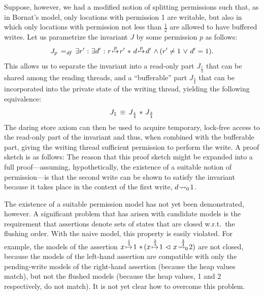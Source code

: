 \documentclass[11pt]{report}
\begin{document}
Suppose, however, we had a modified notion of splitting permissions such that, as in Bornat's model, only locations with permission 1 are writable, but also in which only locations with permission not less than $\frac{1}{2}$ are allowed to have buffered writes. Let us parametrize the invariant $J$ by some permission $p$ as follows: \[ J_p \operatorname{\;=_{\mathit{df}}\;} \exists r' \operatorname{\,:\,} \exists d' \operatorname{\,:\,} r \stackrel{p}{\!\mapsto\!} r' \operatorname{\,\ast\,} d \stackrel{p}{\!\mapsto\!} d' \operatorname{\,\wedge\,} (r' \neq 1 \operatorname{\,\vee\,} d' = 1). \] This allows us to separate the invariant into a read-only part $J_{\frac{1}{4}}$ that can be shared among the reading threads, and a ``bufferable'' part $J_{\frac{3}{4}}$ that can be incorporated into the private state of the writing thread, yielding the following equivalence: \[ J_1 \,\equiv\, J_{\frac{1}{4}} \operatorname{\,\ast\,} J_{\frac{3}{4}}\] The daring store axiom can then be used to acquire temporary, lock-free access to the read-only part of the invariant and thus, when combined with the bufferable part, giving the writing thread sufficient permission to perform the write. A proof sketch is as follows: 
 The reason that this proof sketch might be expanded into a full proof---assuming, hypothetically, the existence of a suitable notion of permission---is that the second write can be shown to satisfy the invariant because it takes place in the context of the first write, $d \!\leadsto_{0}\! 1$. 

The existence of a suitable permission model has not yet been demonstrated, however. A significant problem that has arisen with candidate models is the requirement that assertions denote sets of states that are closed w.r.t.\ the flushing order. With the naive model, this property is easily violated. For example, the models of the assertion $x \stackrel{\frac{1}{4}}{\!\mapsto\!} 1 \operatorname{\,\ast\,} (x \stackrel{\frac{3}{4}}{\!\mapsto\!} 1 \operatorname{\,\vartriangleleft\,} x \stackrel{\frac{3}{4}}{\!\leadsto_{0}\!} 2)$ are not closed, because the models of the left-hand assertion are compatible with only the pending-write models of the right-hand assertion (because the heap values match), but not the flushed models (because the heap values, 1 and 2 respectively, do not match). It is not yet clear how to overcome this problem.  
\end{document}
